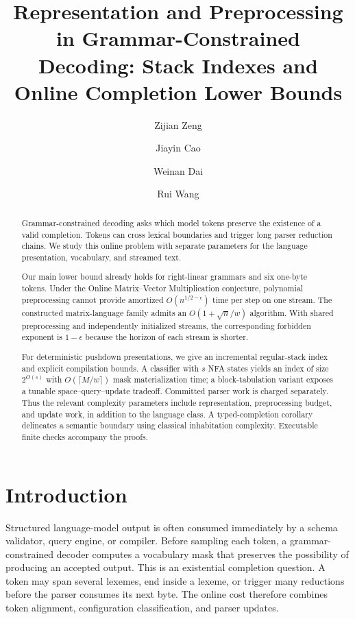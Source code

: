 \documentclass[manuscript,screen,11pt,nonacm]{acmart}
\title[Representation and Preprocessing in Grammar-Constrained Decoding]{Representation and Preprocessing in Grammar-Constrained Decoding: Stack Indexes and Online Completion Lower Bounds}
\author{Zijian Zeng}
\affiliation{\institution{UCSI University}\country{Malaysia}}
\author{Jiayin Cao}
\affiliation{\institution{Ningbo University}\country{China}}
\author{Weinan Dai}
\affiliation{\institution{Zhejiang University}\country{China}}
\author{Rui Wang}
\affiliation{\institution{Nanchang Institute of Technology}\country{China}}
\theoremstyle{definition}\newtheorem{definition}{Definition}
\begin{document}
\begin{abstract}
Grammar-constrained decoding asks which model tokens preserve the existence of a valid completion. Tokens can cross lexical boundaries and trigger long parser reduction chains. We study this online problem with separate parameters for the language presentation, vocabulary, and streamed text.

Our main lower bound already holds for right-linear grammars and six one-byte tokens. Under the Online Matrix--Vector Multiplication conjecture, polynomial preprocessing cannot provide amortized $O(n^{1/2-\epsilon})$ time per step on one stream. The constructed matrix-language family admits an $O(1+\sqrt n/w)$ algorithm. With shared preprocessing and independently initialized streams, the corresponding forbidden exponent is $1-\epsilon$ because the horizon of each stream is shorter.

For deterministic pushdown presentations, we give an incremental regular-stack index and explicit compilation bounds. A classifier with $s$ NFA states yields an index of size $2^{O(s)}$ with $O(\lceil M/w\rceil)$ mask materialization time; a block-tabulation variant exposes a tunable space--query--update tradeoff. Committed parser work is charged separately. Thus the relevant complexity parameters include representation, preprocessing budget, and update work, in addition to the language class. A typed-completion corollary delineates a semantic boundary using classical inhabitation complexity. Executable finite checks accompany the proofs.
\end{abstract}
\maketitle
{}
\pagestyle{plain}\thispagestyle{plain}
\clearpage
\section{Introduction}
Structured language-model output is often consumed immediately by a schema validator, query engine, or compiler. Before sampling each token, a grammar-constrained decoder computes a vocabulary mask that preserves the possibility of producing an accepted output. This is an existential completion question. A token may span several lexemes, end inside a lexeme, or trigger many reductions before the parser consumes its next byte. The online cost therefore combines token alignment, configuration classification, and parser updates.
\end{document}
